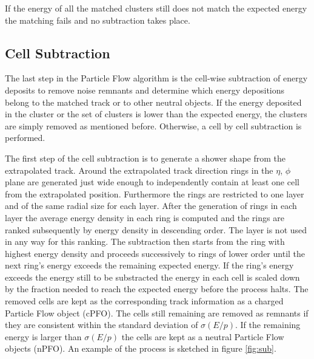If the energy of all the matched clusters still does not match the expected energy the matching fails and no subtraction takes place.

\subsection{Cell Subtraction}

The last step in the Particle Flow algorithm is the cell-wise subtraction of energy deposits to remove noise remnants and determine which energy depositions belong to the matched track or to other neutral objects.
If the energy deposited in the cluster or the set of clusters is lower than the expected energy, the clusters are simply removed as mentioned before. Otherwise, a cell by cell subtraction is performed.

The first step of the cell subtraction is to generate a shower shape from the extrapolated track. Around the extrapolated track direction rings in the $\eta$, $\phi$ plane are generated just wide enough to independently contain at least one cell from the extrapolated position. Furthermore the rings are restricted to one layer and of the same radial size for each layer.
After the generation of rings in each layer the average energy density in each ring is computed and the rings are ranked subsequently by energy density in descending order. The layer is not used in any way for this ranking.
The subtraction then starts from the ring with highest energy density and proceeds successively to rings of lower order until the next ring's energy exceeds the remaining expected energy.
If the ring's energy exceeds the energy still to be substracted the energy in each cell is scaled down by the fraction needed to reach the expected energy before the process halts. The removed cells are kept as the corresponding track information as a charged Particle Flow object (cPFO). The cells still remaining are removed as remnants if they are consistent within the standard deviation of $\sigma (E/p)$. If the remaining energy is larger than $\sigma (E/p)$ the cells are kept as a neutral Particle Flow objects (nPFO).
An example of the process is sketched in figure \ref{fig:sub}. 




